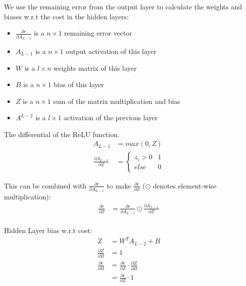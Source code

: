 We use the remaining error from the output layer to calculate the weights and
biases w.r.t the cost in the hidden layers:
\begin{itemize}
    \item \( \frac{\partial c}{\partial A_{L-1}} \) is a \( n \times 1 \) remaining error vector 
    \item \( A_{L-1} \) is a  \( n \times 1 \) output activation of this layer
    \item \( W \) is a \( l \times n \) weights matrix of this layer
    \item \( B \) is a \( n \times 1 \) bias of this layer
    \item \( Z \) is a \( n \times 1 \) sum of the matrix multiplication and bias
    \item \(A^{L-2} \) is a \( l \times 1 \) activation of the previous layer
\end{itemize}

The differential of the ReLU function.
\begin{equation}
    \begin{aligned}
        A_{L-1} &= max(0,Z)\\[2em]
        \frac{\partial A_{L-1}}{\partial Z} &= 
        \begin{cases}
            z_{i} > 0 & 1 \\
            else & 0
        \end{cases}
    \end{aligned}
\end{equation}

This can be combined with \( \frac{\partial c}{\partial A_{L-1}} \) to make \(
\frac{\partial c}{\partial Z} \) (\( \odot \) denotes element-wise
multiplication):
\begin{equation}
    \begin{aligned}
        \frac{\partial c}{\partial Z} &= \frac{\partial c}{\partial A_{L-1}} \odot \frac{\partial A_{L-1}}{\partial Z}\\
    \end{aligned}
\end{equation}

Hidden Layer bias w.r.t cost:
\begin{equation}
    \begin{aligned}
        Z &= W^{T}A_{L-2} + B\\
        \frac{\partial Z}{\partial B} &= 1\\[2em]
        \frac{\partial c}{\partial B} &= \frac{\partial c}{\partial Z} \cdot \frac{\partial Z}{\partial B}\\
                                      &= \frac{\partial c}{\partial Z} \cdot 1
    \end{aligned}
\end{equation}

